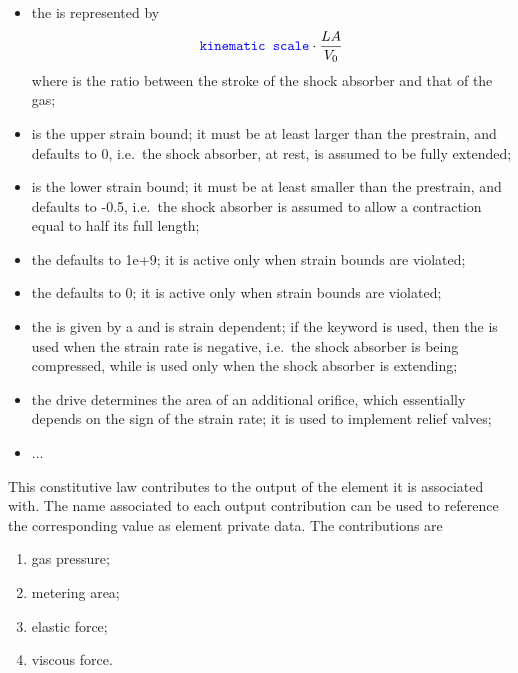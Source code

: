 \begin{itemize}
\item the  is represented by
\begin{displaymath}
	\textcolor{blue}{\texttt{kinematic scale}} \cdot \frac{L A}{V_0}
\end{displaymath}
where  is the ratio between the stroke
of the shock absorber and that of the gas;
\item {} is the upper strain bound; it must be
at least larger than the prestrain, and defaults to 0,
i.e.\ the shock absorber, at rest, is assumed to be fully
extended;
\item {} is the lower strain bound; it must be
at least smaller than the prestrain, and defaults to -0.5, 
i.e.\ the shock absorber is assumed to allow a contraction
equal to half its full length;
\item the  defaults to 1e+9;
it is active only when strain bounds are violated;
\item the  defaults to 0;
it is active only when strain bounds are violated;
\item the  is given by a  
and is strain dependent; if the keyword  is used, 
then the  is used
when the strain rate is negative, i.e.\ the shock absorber
is being compressed, while  is used only
when the shock absorber is extending;
\item the  drive determines the area of an
additional orifice, which essentially depends on the sign
of the strain rate; it is used to implement relief valves;
\item ...
\end{itemize}
This constitutive law contributes to the output of the element
it is associated with.
The name associated to each output contribution can be used to reference
the corresponding value as element private data.
The contributions are
\begin{enumerate}
\item {} gas pressure;
\item {} metering area;
\item {} elastic force;
\item {} viscous force.
\end{enumerate}

